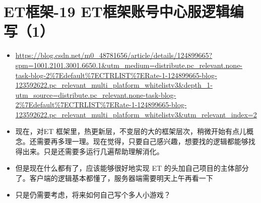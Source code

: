 \documentclass[9pt, b5paper]{article}
\begin{document}
\section{ET框架-19 ET框架账号中心服逻辑编写（1）}
\label{sec-6}
\begin{itemize}
\item \url{https://blog.csdn.net/m0_48781656/article/details/124899665?spm=1001.2101.3001.6650.1&utm_medium=distribute.pc_relevant.none-task-blog-2\%7Edefault\%7ECTRLIST\%7ERate-1-124899665-blog-123592622.pc_relevant_multi_platform_whitelistv3&depth_1-utm_source=distribute.pc_relevant.none-task-blog-2\%7Edefault\%7ECTRLIST\%7ERate-1-124899665-blog-123592622.pc_relevant_multi_platform_whitelistv3&utm_relevant_index=2}
\item 现在，对ET 框架里，热更新层，不变层的大的框架层次，稍微开始有点儿概念。还需要再多理一理。现在觉得，只要自己感兴趣，想要找的逻辑都能够找得出来。只是还需要多运行几遍帮助理解消化。
\item 但是现在什么都有了，应该能够很好地实现 ET 的头加自己项目的主体部分了。客户端的逻辑基本都懂了，服务器端需要明天上午再看一下
\item 只是仍需要考虑，将来如何自己写个多人小游戏？
\end{itemize}
\end{document}
